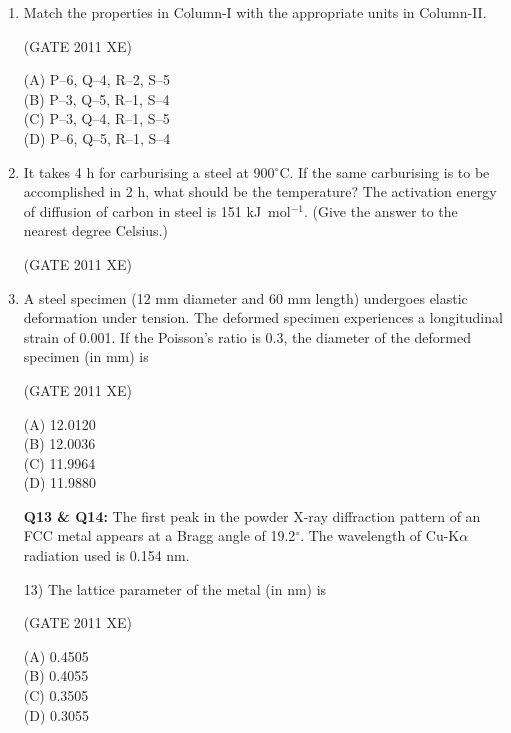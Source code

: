 \documentclass[journal,12pt,onecolumn]{IEEEtran}
\begin{document}
\begin{enumerate}
\item Match the properties in Column-I with the appropriate units in Column-II.



\hfill{(GATE 2011 XE)}\\
\begin{multicols}{2}
(A) P–6, Q–4, R–2, S–5 \\
(B) P–3, Q–5, R–1, S–4 \\
(C) P–3, Q–4, R–1, S–5 \\
(D) P–6, Q–5, R–1, S–4
\end{multicols}

\item It takes 4 h for carburising a steel at 900$^\circ$C. If the same carburising is to be accomplished in 2 h, what should be the temperature? The activation energy of diffusion of carbon in steel is 151 kJ~mol$^{-1}$.
(Give the answer to the nearest degree Celsius.)

\hfill{(GATE 2011 XE)}\\


\item A steel specimen (12 mm diameter and 60 mm length) undergoes elastic deformation under tension. The deformed specimen experiences a longitudinal strain of 0.001. If the Poisson's ratio is 0.3, the diameter of the deformed specimen (in mm) is

\hfill{(GATE 2011 XE)}\\
\begin{multicols}{4}
(A) 12.0120 \\
(B) 12.0036 \\
(C) 11.9964 \\
(D) 11.9880
\end{multicols}

\newpage

\item[\textbf{Q13 \& Q14:}] The first peak in the powder X-ray diffraction pattern of an FCC metal appears at a Bragg angle of 19.2$^{\circ}$. The wavelength of Cu-K$\alpha$ radiation used is 0.154 nm.

\item[13)] The lattice parameter of the metal (in nm) is

\hfill{(GATE 2011 XE)}\\
\begin{multicols}{4}
(A) 0.4505 \\
(B) 0.4055 \\
(C) 0.3505 \\
(D) 0.3055
\end{multicols}


\end{enumerate}
\end{document}
